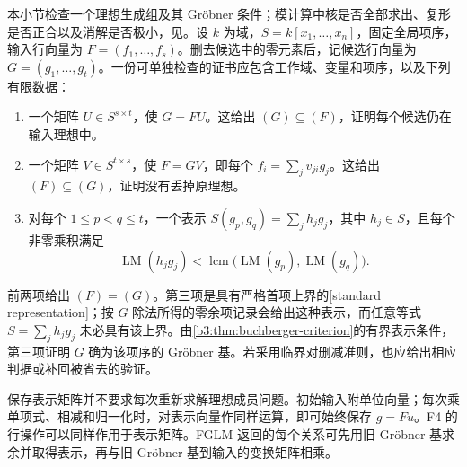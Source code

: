 本小节检查一个理想生成组及其 Gröbner 条件；模计算中核是否全部求出、复形是否正合以及消解是否极小，见。设 \(k\) 为域，\(S=k[x_1,\ldots,x_n]\)，固定全局项序，输入行向量为 \(F=(f_1,\ldots,f_s)\)。删去候选中的零元素后，记候选行向量为 \(G=(g_1,\ldots,g_t)\)。一份可单独检查的证书应包含工作域、变量和项序，以及下列有限数据：
\begin{enumerate}
	\item 一个矩阵 \(U\in S^{s\times t}\)，使 \(G=FU\)。这给出 \((G)\subseteq(F)\)，证明每个候选仍在输入理想中。
	\item 一个矩阵 \(V\in S^{t\times s}\)，使 \(F=GV\)，即每个 \(f_i=\sum_jv_{ji}g_j\)。这给出 \((F)\subseteq(G)\)，证明没有丢掉原理想。
	\item 对每个 \(1\le p<q\le t\)，一个表示 \(S(g_p,g_q)=\sum_jh_jg_j\)，其中 \(h_j\in S\)，且每个非零乘积满足
		\[
			\operatorname{LM}(h_jg_j)< \operatorname{lcm}\bigl(\operatorname{LM}(g_p),\operatorname{LM}(g_q)\bigr).
		\]
\end{enumerate}
前两项给出 \((F)=(G)\)。第三项是具有严格首项上界的[standard representation]；按 \(G\) 除法所得的零余项记录会给出这种表示，而任意等式 \(S=\sum_jh_jg_j\) 未必具有该上界。由\cref{b3:thm:buchberger-criterion}的有界表示条件，第三项证明 \(G\) 确为该项序的 Gröbner 基。若采用临界对删减准则，也应给出相应判据或补回被省去的验证。

\ProseParagraphBreak
保存表示矩阵并不要求每次重新求解理想成员问题。初始输入附单位向量；每次乘单项式、相减和归一化时，对表示向量作同样运算，即可始终保存 \(g=Fu\)。F4 的行操作可以同样作用于表示矩阵。FGLM 返回的每个关系可先用旧 Gröbner 基求余并取得表示，再与旧 Gröbner 基到输入的变换矩阵相乘。

